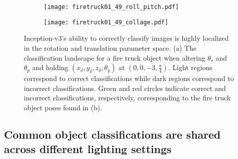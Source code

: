 \documentclass[10pt,twocolumn,letterpaper]{article}
\begin{document}

\begin{figure}[h]
\begin{subfigure}{\linewidth}
    \texttt{[image: firetruck01\_49\_roll\_pitch.pdf]}
    \caption{}\label{fig:fire_truck_roll_pitch}
\end{subfigure}
\begin{subfigure}{\linewidth}
    \centering
    \texttt{[image: firetruck01\_49\_collage.pdf]}
    \caption{}\label{fig:fire_truck_pitch_roll_collage}
\end{subfigure}
\caption{
Inception-v3's ability to correctly classify images is highly localized in the rotation and translation parameter space.
(a) The classification landscape for a fire truck object when altering $\theta_{r}$ and $\theta_{p}$ and holding $(x_{\delta}, y_{\delta}, z_{\delta}, \theta_{y})$ at $(0, 0, -3, \frac{\pi}{4})$.
Light regions correspond to correct classifications while dark regions correspond to incorrect classifications.
Green and red circles indicate correct and incorrect classifications, respectively, corresponding to the fire truck object poses found in (b).
}\label{fig:landscape}
\end{figure}


\subsection{Common object classifications are shared across different lighting settings}
\end{document}

